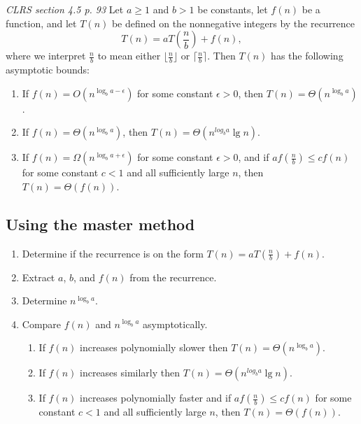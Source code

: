 \textit{CLRS section 4.5 p. 93}
Let $ a \ge 1 $ and $ b > 1 $ be constants, let $ f(n) $ be a function, and let $ T(n) $ be defined on the nonnegative integers by the recurrence
$$ T(n) = aT\left( \frac{n}{b}\right) + f(n), $$
where we interpret $ \frac{n}{b} $ to mean either $ \lfloor \frac{n}{b}\rfloor $ or $ \lceil\frac{n}{b} \rceil$.
Then $ T(n) $ has the following asymptotic bounds:
\begin{enumerate}
    \item If $ f(n)=O\left( n^{\log_ba-\epsilon} \right) $ for some constant $ \epsilon > 0 $, then $ T(n)=\Theta\left( n^{\log_ba}\right)$.
    \item If $ f(n)=\Theta\left( n^{\log_ba}\right) $, then $ T(n)=\Theta\left( n^{log_ba}\lg n\right)  $.
    \item If $ f(n)=\Omega\left( n^{\log_ba+\epsilon}\right)  $ for some constant $ \epsilon > 0 $, and if $ af\left( \frac{n}{b}\right) \leq cf(n) $ for some constant $  c < 1 $ and all sufficiently large $ n $, then $ T(n)=\Theta(f(n)) $.
\end{enumerate}
\subsection{Using the master method}
\begin{enumerate}
    \item Determine if the recurrence is on the form $ T(n) = aT\left( \frac{n}{b}\right) + f(n) $.
    \item Extract $ a $, $ b $, and $ f(n) $ from the recurrence.
    \item Determine $ n^{\log_b a} $.
    \item Compare $ f(n) $ and $ n^{\log_b a} $ asymptotically.
    \begin{enumerate}
        \item If $ f(n) $ increases polynomially slower then $ T(n)=\Theta\left( n^{\log_ba}\right)$.
        \item If $ f(n) $ increases similarly then $ T(n)=\Theta\left( n^{log_ba}\lg n\right)  $.
        \item If $ f(n) $ increases polynomially faster and if $ af\left( \frac{n}{b}\right) \leq cf(n) $ for some constant $  c < 1 $ and all sufficiently large $ n $, then $ T(n)=\Theta(f(n)) $.
    \end{enumerate}
\end{enumerate}